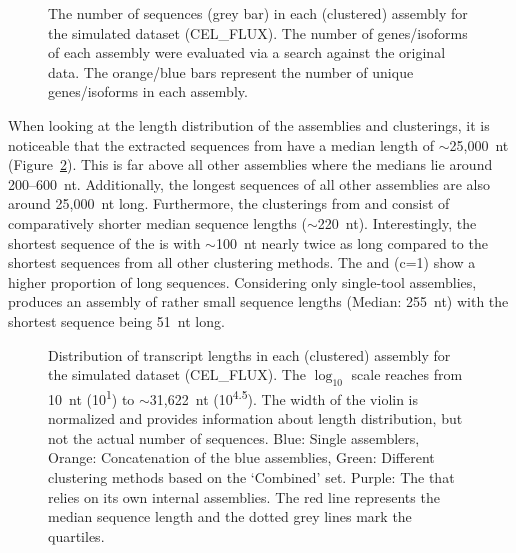 \documentclass[12pt,a4paper,english]{article}
\begin{document}
	\begin{figure}[H]
		\centering
		\def\svgwidth{\textwidth}
		
		\caption[The number of sequences in each (clustered) assembly (PE, CEL\_FLUX).]{The number of sequences (grey bar) in each (clustered) assembly for the simulated \celegans dataset (CEL\_FLUX). The number of genes/isoforms of each assembly were evaluated via a \blast search against the original data. The orange/blue bars represent the number of unique genes/isoforms in each assembly.}
		\label{img:barchart_flux}
	\end{figure}
		\newpage
		When looking at the length distribution of the assemblies and clusterings, it is noticeable that the extracted sequences from \grouper have a median length of $\sim$25,000~nt (Figure~\ref{img:violin_flux}). This is far above all other assemblies where the medians lie around 200--600~nt. 
		Additionally, the longest sequences of all other assemblies are also around 25,000~nt long.
		Furthermore, the clusterings from \karma and \mclusttwo consist of comparatively shorter median sequence lengths ($\sim$220~nt).
		Interestingly, the shortest sequence of the \orp is with $\sim$100~nt nearly twice as long compared to the shortest sequences from all other clustering methods.
		The \orp and \cdhit (c=1) show a higher proportion of long sequences.
		Considering only single-tool assemblies, \soap produces an assembly of rather small sequence lengths (Median: 255~nt) with the shortest sequence being 51~nt long. 

	\begin{figure}[H]
		\centering
		\def\svgwidth{\textwidth}
		
		\caption[Distribution of transcript lengths per assembly (PE, CEL\_FLUX)]{Distribution of transcript lengths in each (clustered) assembly for the simulated \celegans dataset (CEL\_FLUX). The $\log_{10}$ scale reaches from 10~nt (10\textsuperscript{1}) to $\sim$31,622~nt (10\textsuperscript{4.5}). The width of the violin is normalized and provides information about length distribution, but not the actual number of sequences. Blue: Single assemblers, Orange: Concatenation of the blue assemblies, Green: Different clustering methods based on the `Combined' set. Purple: The \orp that relies on its own internal assemblies. The red line represents the median sequence length and the dotted grey lines mark the quartiles.}
		\label{img:violin_flux}
	\end{figure}
\end{document}
